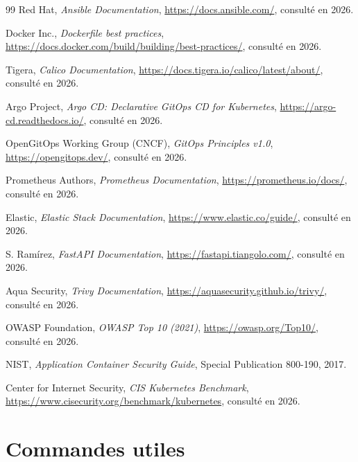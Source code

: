 \documentclass[12pt,a4paper,twoside,openright]{report}
\makeatletter
\renewcommand{\chaptername}{Chapitre}
\def\cleardoublepage{\clearpage\if@twoside
  \ifodd\c@page\else\hbox{}\thispagestyle{empty}\newpage\fi\fi}
\makeatother
\begin{document}
\begin{thebibliography}{99}
 Red Hat, \emph{Ansible Documentation},
\url{https://docs.ansible.com/}, consulté en 2026.

 Docker Inc., \emph{Dockerfile best practices},
\url{https://docs.docker.com/build/building/best-practices/}, consulté en 2026.

 Tigera, \emph{Calico Documentation},
\url{https://docs.tigera.io/calico/latest/about/}, consulté en 2026.

 Argo Project, \emph{Argo CD: Declarative GitOps CD for Kubernetes},
\url{https://argo-cd.readthedocs.io/}, consulté en 2026.

 OpenGitOps Working Group (CNCF),
\emph{GitOps Principles v1.0}, \url{https://opengitops.dev/}, consulté en 2026.

 Prometheus Authors, \emph{Prometheus Documentation},
\url{https://prometheus.io/docs/}, consulté en 2026.

 Elastic, \emph{Elastic Stack Documentation},
\url{https://www.elastic.co/guide/}, consulté en 2026.

 S. Ramírez, \emph{FastAPI Documentation},
\url{https://fastapi.tiangolo.com/}, consulté en 2026.

 Aqua Security, \emph{Trivy Documentation},
\url{https://aquasecurity.github.io/trivy/}, consulté en 2026.

 OWASP Foundation, \emph{OWASP Top 10 (2021)},
\url{https://owasp.org/Top10/}, consulté en 2026.

 NIST, \emph{Application Container Security Guide},
Special Publication 800-190, 2017.

 Center for Internet Security,
\emph{CIS Kubernetes Benchmark}, \url{https://www.cisecurity.org/benchmark/kubernetes},
consulté en 2026.

\end{thebibliography}

\cleardoublepage

\appendix
\renewcommand{\chaptername}{Annexe}
\renewcommand{\cftchappresnum}{Annexe }
\addtolength{\cftchapnumwidth}{3.2em}

\chapter{Commandes utiles}
\end{document}
